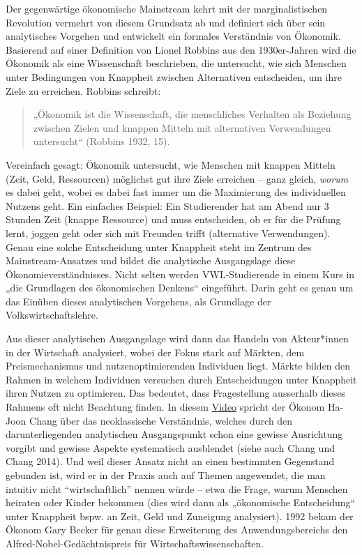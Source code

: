 \documentclass[
  nswissgerman,
  a4paper,
  DIV=11,
  numbers=noendperiod,
  oneside,
  openany]{scrreprt}
\begin{document}
Der gegenwärtige ökonomische Mainstream kehrt mit der marginalistischen
Revolution vermehrt von diesem Grundsatz ab und definiert sich über sein
analytisches Vorgehen und entwickelt ein formales Verständnis von
Ökonomik. Basierend auf einer Definition von Lionel Robbins aus den
1930er-Jahren wird die Ökonomik als eine Wissenschaft beschrieben, die
untersucht, wie sich Menschen unter Bedingungen von Knappheit zwischen
Alternativen entscheiden, um ihre Ziele zu erreichen. Robbins schreibt:

\begin{quote}
„Ökonomik ist die Wissenschaft, die menschliches Verhalten als Beziehung
zwischen Zielen und knappen Mitteln mit alternativen Verwendungen
untersucht`` (Robbins 1932, 15).
\end{quote}

Vereinfach gesagt: Ökonomik untersucht, wie Menschen mit knappen Mitteln
(Zeit, Geld, Ressourcen) möglichst gut ihre Ziele erreichen -- ganz
gleich, \emph{worum} es dabei geht, wobei es dabei fast immer um die
Maximierung des individuellen Nutzens geht. Ein einfaches Beispiel: Ein
Studierender hat am Abend nur 3 Stunden Zeit (knappe Ressource) und muss
entscheiden, ob er für die Prüfung lernt, joggen geht oder sich mit
Freunden trifft (alternative Verwendungen). Genau eine solche
Entscheidung unter Knappheit steht im Zentrum des Mainstream-Ansatzes
und bildet die analytische Ausgangslage diese Ökonomieverständnisses.
Nicht selten werden VWL-Studierende in einem Kurs in „die Grundlagen des
ökonomischen Denkens`` eingeführt. Darin geht es genau um das Einüben
dieses analytischen Vorgehens, als Grundlage der Volkswirtschaftslehre.

Aus dieser analytischen Ausgangslage wird dann das Handeln von
Akteur*innen in der Wirtschaft analysiert, wobei der Fokus stark auf
Märkten, dem Preismechanismus und nutzenoptimierenden Individuen liegt.
Märkte bilden den Rahmen in welchem Individuen versuchen durch
Entscheidungen unter Knappheit ihren Nutzen zu optimieren. Das bedeutet,
dass Fragestellung ausserhalb dieses Rahmens oft nicht Beachtung finden.
In diesem \href{https://www.youtube.com/watch?v=D-6rQmHpGfE}{Video}
spricht der Ökonom Ha-Joon Chang über das neoklassische Verständnis,
welches durch den darunterliegenden analytischen Ausgangspunkt schon
eine gewisse Ausrichtung vorgibt und gewisse Aspekte systematisch
ausblendet (siehe auch Chang und Chang 2014). Und weil dieser Ansatz
nicht an einen bestimmten Gegenstand gebunden ist, wird er in der Praxis
auch auf Themen angewendet, die man intuitiv nicht ``wirtschaftlich''
nennen würde -- etwa die Frage, warum Menschen heiraten oder Kinder
bekommen (dies wird dann als „ökonomische Entscheidung`` unter Knappheit
bspw. an Zeit, Geld und Zuneigung analysiert). 1992 bekam der Ökonom
Gary Becker für genau diese Erweiterung des Anwendungsbereichs den
Alfred-Nobel-Gedächtnispreis für Wirtschaftswissenschaften.
\end{document}

